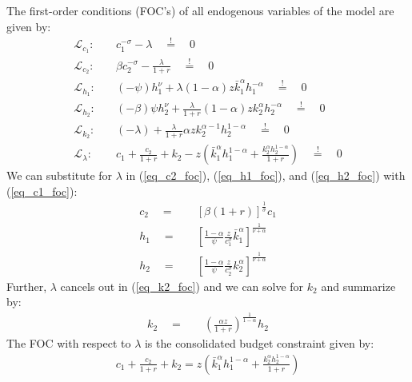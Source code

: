 \documentclass[a4paper, 12pt]{article}
\begin{document}
\begin{Answer}%
	The first-order conditions (FOC's) of all endogenous variables of the model are given by: 
		\begin{align}
			\mathcal{L}_{c_1}: & \quad c_1^{-\sigma} - \lambda \quad \overset{!}{=} \quad 0\label{eq_c1_foc}\\
			\mathcal{L}_{c_2}: & \quad \beta c_2^{-\sigma} - \frac{\lambda}{1+r} \quad \overset{!}{=} \quad 0\label{eq_c2_foc}\\
			\mathcal{L}_{h_1}: & \quad \left(-\psi\right) h_1^\nu + \lambda \left(1-\alpha\right) z \bar{k}_1^\alpha h_1^{-\alpha} \quad \overset{!}{=} \quad 0\label{eq_h1_foc}\\
			\mathcal{L}_{h_2}: & \quad \left(-\beta\right) \psi h_2^\nu + \frac{\lambda}{1+r} \left(1-\alpha\right) z k_2^\alpha h_2^{-\alpha} \quad \overset{!}{=} \quad 0\label{eq_h2_foc}\\
			\mathcal{L}_{k_2}: & \quad \left(-\lambda\right) + \frac{\lambda}{1+r} \alpha z k_2^{\alpha-1} h_2^{1-\alpha} \quad \overset{!}{=} \quad 0\label{eq_k2_foc}\\
			\mathcal{L}_{\lambda}: & \quad c_1 + \frac{c_2}{1+r} + k_2 - z \left(\bar{k}_1^\alpha h_1^{1-\alpha} + \frac{k_2^\alpha h_2^{1-\alpha}}{1+r} \right) \quad \overset{!}{=} \quad 0
		\end{align}\label{eq_lambda_foc}
		We can substitute for $\lambda$ in (\ref{eq_c2_foc}), (\ref{eq_h1_foc}), and (\ref{eq_h2_foc}) with (\ref{eq_c1_foc}):
		\begin{align}
			c_2 \quad = & \quad \left[\beta \left(1+r\right)\right]^{\frac{1}{\sigma}} c_1\label{eq_c2_foc_solved}\\
			h_1 \quad = & \quad \left[\frac{1-\alpha}{\psi} \frac{z}{c_1^\sigma} \bar{k}_1^\alpha\right]^{\frac{1}{\nu+\alpha}}\label{eq_h1_foc_solved}\\
			h_2 \quad = & \quad \left[\frac{1-\alpha}{\psi} \frac{z}{c_2^\sigma} k_2^\alpha\right]^{\frac{1}{\nu+\alpha}}\label{eq_h2_foc_solved}
		\end{align}
		Further, $\lambda$ cancels out in (\ref{eq_k2_foc}) and we can solve for $k_2$ and summarize by:
		\begin{align}
			k_2 \quad = & \quad \left(\frac{\alpha z}{1+r}\right)^{\frac{1}{1-\alpha}} h_2\label{eq_k2_foc_solved}
		\end{align}
		The FOC with respect to $\lambda$ is the consolidated budget constraint given by:
		\begin{align}
			c_1 + \frac{c_2}{1+r} + k_2 = z \left(\bar{k}_1^\alpha h_1^{1-\alpha} + \frac{k_2^\alpha h_2^{1-\alpha}}{1+r} \right)\label{eq_lambda_foc_solved}

\end{align}
\end{Answer}
\end{document}
